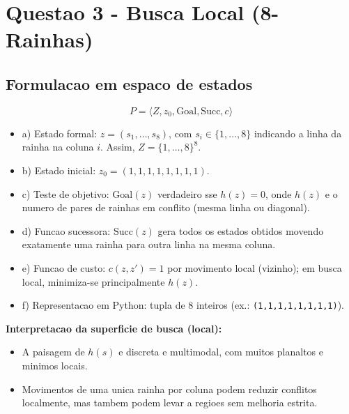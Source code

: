 \section{Questao 3 - Busca Local (8-Rainhas)}

\subsection{Formulacao em espaco de estados}
\[
P = \langle Z, z_0, \text{Goal}, \text{Succ}, c \rangle
\]
\begin{itemize}[leftmargin=1.5em]
  \item a) Estado formal: $z=(s_1,\dots,s_8)$, com $s_i \in \{1,\dots,8\}$ indicando a linha da rainha na coluna $i$. Assim, $Z=\{1,\dots,8\}^8$.
  \item b) Estado inicial: $z_0=(1,1,1,1,1,1,1,1)$.
  \item c) Teste de objetivo: $\text{Goal}(z)$ verdadeiro sse $h(z)=0$, onde $h(z)$ e o numero de pares de rainhas em conflito (mesma linha ou diagonal).
  \item d) Funcao sucessora: $\text{Succ}(z)$ gera todos os estados obtidos movendo exatamente uma rainha para outra linha na mesma coluna.
  \item e) Funcao de custo: $c(z,z')=1$ por movimento local (vizinho); em busca local, minimiza-se principalmente $h(z)$.
  \item f) Representacao em Python: tupla de 8 inteiros (ex.: \texttt{(1,1,1,1,1,1,1,1)}).
\end{itemize}

\textbf{Interpretacao da superficie de busca (local):}
\begin{itemize}[leftmargin=1.5em]
  \item A paisagem de $h(s)$ e discreta e multimodal, com muitos planaltos e minimos locais.
  \item Movimentos de uma unica rainha por coluna podem reduzir conflitos localmente, mas tambem podem levar a regioes sem melhoria estrita.
\end{itemize}

